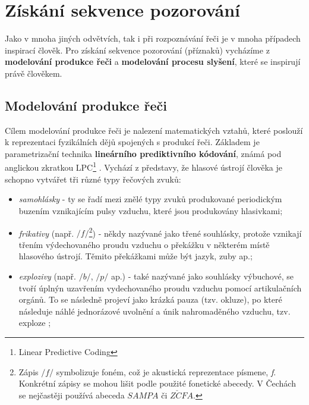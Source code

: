 \section{Získání sekvence pozorování}
\label{chap:asr:parametrization}

Jako v mnoha jiných odvětvích, tak i při rozpoznávání řeči je v mnoha případech inspirací člověk. Pro získání sekvence pozorování (příznaků) vycházíme z \textbf{modelování produkce řeči} a \textbf{modelování procesu slyšení}, které se inspirují právě člověkem.

\subsection{Modelování produkce řeči}
\label{chap:asr:parametrization:production}

Cílem modelování produkce řeči je nalezení matematických vztahů, které poslouží k reprezentaci fyzikálních dějů spojených s produkcí řeči. Základem je parametrizační technika \textbf{lineárního prediktivního kódování}, známá pod anglickou zkratkou LPC\footnote{Linear Predictive Coding} \cite{Benesty2007}. Vychází z představy, že hlasové ústrojí člověka je schopno vytvářet tři různé typy řečových zvuků:

\begin{itemize}
  \item \textit{samohlásky} - ty se řadí mezi znělé typy zvuků produkované periodickým buzením vznikajícím pulsy vzduchu, které jsou produkovány hlasivkami;
  \item \textit{frikativy} (např. $/f/$\footnote{Zápis $/f/$ symbolizuje foném, což je akustická reprezentace písmene, \textit{f}. Konkrétní zápisy se mohou lišit podle použité fonetické abecedy. V Čechách se nejčastěji používá abeceda $SAMPA$ či $Z\check{C}FA$.}) - někdy nazývané jako třené souhlásky, protože vznikají třením výdechovaného proudu vzduchu o překážku v některém místě hlasového ústrojí. Těmito překážkami může být jazyk, zuby ap.;
  \item \textit{explozivy} (např. $/b/$, $/p/$ ap.) - také nazývané jako souhlásky výbuchové, se tvoří úplnýn uzavřením vydechovaného proudu vzduchu pomocí artikulačních orgánů. To se následně projeví jako krázká pauza (tzv. okluze), po které následuje náhlé jednorázové uvolnění a únik nahromaděného vzduchu, tzv. exploze \cite{Psutka2006};
\end{itemize}


